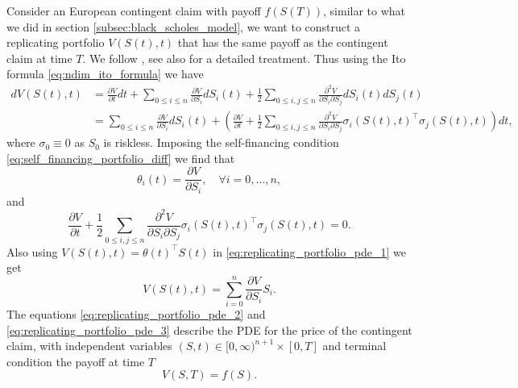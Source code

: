 Consider an European contingent claim with payoff $f(S(T))$,
similar to what we did in section \ref{subsec:black_scholes_model},
we want to construct a replicating portfolio $V(S(t), t)$ that has the same payoff as the contingent claim at time $T$.
We follow \cite[Ch.~1]{glasserman_monte_carlo}, see also \cite[Ch.~13]{bjork_arbitrage} for a detailed treatment.
Thus using the Ito formula \eqref{eq:ndim_ito_formula} we have
\begin{equation*}
\begin{aligned}
    dV(S(t), t)
        & = \frac{\partial V}{\partial t} dt
            + \sum_{0 \leq i \leq n} \frac{\partial V}{\partial S_i} dS_i(t)
            + \frac{1}{2}  \sum_{0 \leq i,j \leq n} \frac{\partial^2 V}{\partial S_i \partial S_j} dS_i(t) dS_j(t) \\
        & = \sum_{0 \leq i \leq n} \frac{\partial V}{\partial S_i} dS_i(t)
            + \left( \frac{\partial V}{\partial t} + \frac{1}{2}  \sum_{0 \leq i,j \leq n} \frac{\partial^2 V}{\partial S_i \partial S_j} \sigma_i(S(t), t)^\intercal \sigma_j(S(t), t) \right) dt,
\end{aligned}
\end{equation*}
where $\sigma_0 \equiv 0$ as $S_0$ is riskless.
Imposing the self-financing condition \eqref{eq:self_financing_portfolio_diff} we find that
\begin{equation}\label{eq:replicating_portfolio_pde_1}
    \theta_i(t) = \frac{\partial V}{\partial S_i}, \quad \forall i = 0, \dots, n,
\end{equation}
and 
\begin{equation}\label{eq:replicating_portfolio_pde_2}
    \frac{\partial V}{\partial t} + \frac{1}{2}  \sum_{0 \leq i,j \leq n} \frac{\partial^2 V}{\partial S_i \partial S_j} \sigma_i(S(t), t)^\intercal \sigma_j(S(t), t) = 0.
\end{equation}
Also using $V(S(t), t) = \theta(t)^\intercal S(t)$ in \eqref{eq:replicating_portfolio_pde_1} we get
\begin{equation}\label{eq:replicating_portfolio_pde_3}
    V(S(t), t) = \sum_{i = 0}^n \frac{\partial V}{\partial S_i} S_i.
\end{equation}
The equations \eqref{eq:replicating_portfolio_pde_2} and \eqref{eq:replicating_portfolio_pde_3} describe the PDE for the price of the contingent claim,
with independent variables $(S, t) \in [0, \infty)^{n + 1} \times [0, T]$ and terminal condition the payoff at time $T$
\begin{equation*}
    V(S, T) = f(S).
\end{equation*}

